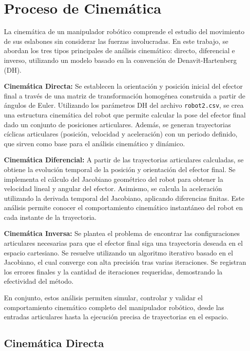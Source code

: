 \section{Proceso de Cinemática} \label{sec:proceso_cinematica}


La cinemática de un manipulador robótico comprende el estudio del movimiento de sus eslabones sin considerar las fuerzas involucradas. En este trabajo, se abordan los tres tipos principales de análisis cinemático: directo, diferencial e inverso, utilizando un modelo basado en la convención de Denavit-Hartenberg (DH).

\textbf{Cinemática Directa:} Se establecen la orientación y posición inicial del efector final a través de una matriz de transformación homogénea construida a partir de ángulos de Euler. Utilizando los parámetros DH del archivo \texttt{robot2.csv}, se crea una estructura cinemática del robot que permite calcular la pose del efector final dado un conjunto de posiciones articulares. Además, se generan trayectorias cíclicas articulares (posición, velocidad y aceleración) con un periodo definido, que sirven como base para el análisis cinemático y dinámico.

\textbf{Cinemática Diferencial:} A partir de las trayectorias articulares calculadas, se obtiene la evolución temporal de la posición y orientación del efector final. Se implementa el cálculo del Jacobiano geométrico del robot para obtener la velocidad lineal y angular del efector. Asimismo, se calcula la aceleración utilizando la derivada temporal del Jacobiano, aplicando diferencias finitas. Este análisis permite conocer el comportamiento cinemático instantáneo del robot en cada instante de la trayectoria.

\textbf{Cinemática Inversa:} Se plantea el problema de encontrar las configuraciones articulares necesarias para que el efector final siga una trayectoria deseada en el espacio cartesiano. Se resuelve utilizando un algoritmo iterativo basado en el Jacobiano, el cual converge con alta precisión tras varias iteraciones. Se registran los errores finales y la cantidad de iteraciones requeridas, demostrando la efectividad del método.

En conjunto, estos análisis permiten simular, controlar y validar el comportamiento cinemático completo del manipulador robótico, desde las entradas articulares hasta la ejecución precisa de trayectorias en el espacio.

\newpage
\subsection{Cinemática Directa}

